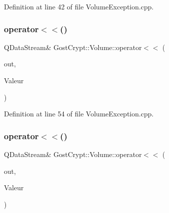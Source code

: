 Definition at line 42 of file Volume\+Exception.\+cpp.

\mbox{\label{namespace_gost_crypt_1_1_volume_aa3ad7a1a13e855f42d810444945486f5}} 
\subsubsection{\texorpdfstring{operator$<$$<$()}{operator<<()}\hspace{0.1cm}{\footnotesize\ttfamily [4/19]}}
{\footnotesize\ttfamily Q\+Data\+Stream\& Gost\+Crypt\+::\+Volume\+::operator$<$$<$ (\begin{DoxyParamCaption}\item[{Q\+Data\+Stream \&}]{out,  }\item[{const \hyperlink{class_gost_crypt_1_1_volume_1_1_encryption_mode_not_initialized}{Gost\+Crypt\+::\+Volume\+::\+Encryption\+Mode\+Not\+Initialized} \&}]{Valeur }\end{DoxyParamCaption})}



Definition at line 54 of file Volume\+Exception.\+cpp.

\mbox{\label{namespace_gost_crypt_1_1_volume_a8f703126ba79f5d84c777400b5e5fac7}} 
\subsubsection{\texorpdfstring{operator$<$$<$()}{operator<<()}\hspace{0.1cm}{\footnotesize\ttfamily [5/19]}}
{\footnotesize\ttfamily Q\+Data\+Stream\& Gost\+Crypt\+::\+Volume\+::operator$<$$<$ (\begin{DoxyParamCaption}\item[{Q\+Data\+Stream \&}]{out,  }\item[{const \hyperlink{class_gost_crypt_1_1_volume_1_1_cipher_algorithm_not_initialized}{Gost\+Crypt\+::\+Volume\+::\+Cipher\+Algorithm\+Not\+Initialized} \&}]{Valeur }\end{DoxyParamCaption})}



